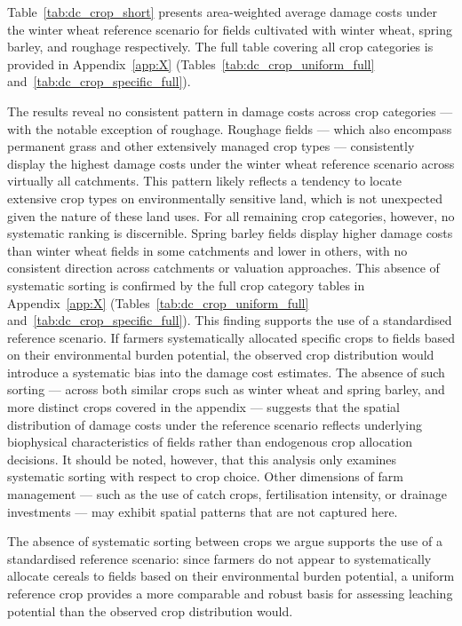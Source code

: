 \documentclass[12pt]{article}
\begin{document}
Table~\ref{tab:dc_crop_short} presents area-weighted average damage costs under the winter wheat reference scenario for fields cultivated with winter wheat, spring barley, and roughage respectively. The full table covering all crop categories is provided in Appendix~\ref{app:X} (Tables~\ref{tab:dc_crop_uniform_full} and~\ref{tab:dc_crop_specific_full}).

The results reveal no consistent pattern in damage costs across crop categories — with the notable exception of roughage. Roughage fields — which also encompass permanent grass and other extensively managed crop types — consistently display the highest damage costs under the winter wheat reference scenario across virtually all catchments. This pattern likely reflects a tendency to locate extensive crop types on environmentally sensitive land, which is not unexpected given the nature of these land uses. For all remaining crop categories, however, no systematic ranking is discernible. Spring barley fields display higher damage costs than winter wheat fields in some catchments and lower in others, with no consistent direction across catchments or valuation approaches. This absence of systematic sorting is confirmed by the full crop category tables in Appendix~\ref{app:X} (Tables~\ref{tab:dc_crop_uniform_full} and~\ref{tab:dc_crop_specific_full}).
This finding supports the use of a standardised reference scenario. If farmers systematically allocated specific crops to fields based on their environmental burden potential, the observed crop distribution would introduce a systematic bias into the damage cost estimates. The absence of such sorting — across both similar crops such as winter wheat and spring barley, and more distinct crops covered in the appendix — suggests that the spatial distribution of damage costs under the reference scenario reflects underlying biophysical characteristics of fields rather than endogenous crop allocation decisions. It should be noted, however, that this analysis only examines systematic sorting with respect to crop choice. Other dimensions of farm management — such as the use of catch crops, fertilisation intensity, or drainage investments — may exhibit spatial patterns that are not captured here.

The absence of systematic sorting between crops we argue supports the use of a standardised reference scenario: since farmers do not appear to systematically allocate cereals to fields based on their environmental burden potential, a uniform reference crop provides a more comparable and robust basis for assessing leaching potential than the observed crop distribution would.



\end{document}
